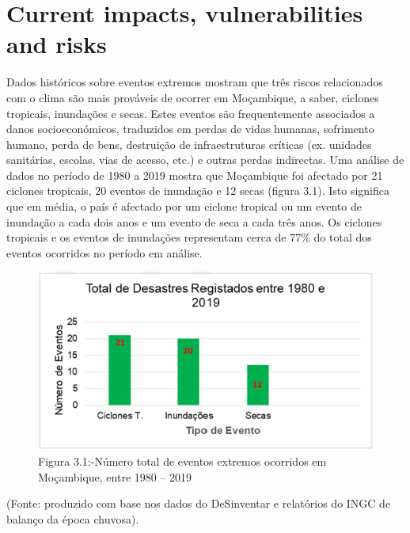 \documentclass[
]{book}
\begin{document}
\hypertarget{current-impacts-vulnerabilities-and-risks}{%
\section{Current impacts, vulnerabilities and risks}\label{current-impacts-vulnerabilities-and-risks}}

Dados históricos sobre eventos extremos mostram que três riscos relacionados com o clima são mais prováveis de ocorrer em Moçambique, a saber, ciclones tropicais, inundações e secas. Estes eventos são frequentemente associados a danos socioeconómicos, traduzidos em perdas de vidas humanas, sofrimento humano, perda de bens, destruição de infraestruturas críticas (ex. unidades sanitárias, escolas, vias de acesso, etc.) e outras perdas indirectas.
Uma análise de dados no período de 1980 a 2019 mostra que Moçambique foi afectado por 21 ciclones tropicais, 20 eventos de inundação e 12 secas (figura 3.1). Isto significa que em média, o país é afectado por um ciclone tropical ou um evento de inundação a cada dois anos e um evento de seca a cada três anos. Os ciclones tropicais e os eventos de inundações representam cerca de 77\% do total dos eventos ocorridos no período em análise.

\begin{figure}
\centering
\includegraphics{images/numero_desastres.png}
\caption{Figura 3.1:-Número total de eventos extremos ocorridos em Moçambique, entre 1980 -- 2019}
\end{figure}

(Fonte: produzido com base nos dados do DeSinventar e relatórios do INGC de balanço da época chuvosa).
\end{document}
